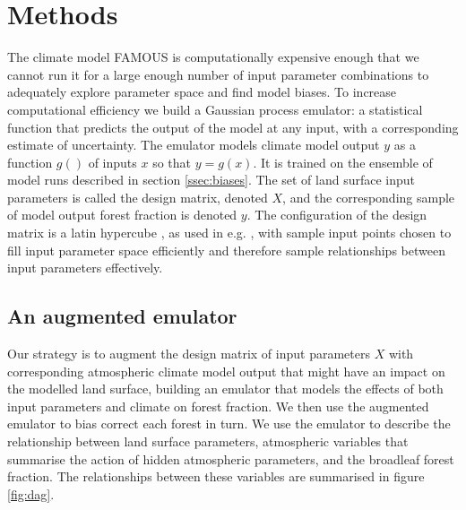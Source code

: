 \documentclass[gmd, manuscript]{copernicus}
\begin{document}
\section{Methods}\label{sec:methods}
The climate model FAMOUS is computationally expensive enough that we cannot run it for a large enough number of input parameter combinations to adequately explore parameter space and find model biases. To increase computational efficiency we build a Gaussian process emulator: a statistical function that predicts the output of the model at any input, with a corresponding estimate of uncertainty. The emulator models climate model output $y$ as a function $g()$ of inputs $x$ so that $y = g(x)$. It is trained on the ensemble of model runs described in section \ref{ssec:biases}. The set of land surface input parameters is called the design matrix, denoted $X$, and the corresponding sample of model output forest fraction is denoted $y$. The configuration of the design matrix is a latin hypercube \citep{mckay1979comparison}, as used in e.g. \cite{gregoire2010optimal,williams2013optimising}, with sample input points chosen to fill input parameter space efficiently and therefore sample relationships between input parameters effectively.

\subsection{An augmented emulator}\label{ssec:augmented}
Our strategy is to augment the design matrix of input parameters $X$ with corresponding atmospheric climate model output that might have an impact on the modelled land surface, building an emulator that models the effects of both input parameters and climate on forest fraction. We then use the augmented emulator to bias correct each forest in turn. We use the emulator to describe the relationship between land surface parameters, atmospheric variables that summarise the action of hidden atmospheric parameters, and the broadleaf forest fraction. The relationships between these variables are summarised in figure \ref{fig:dag}. 
\end{document}
